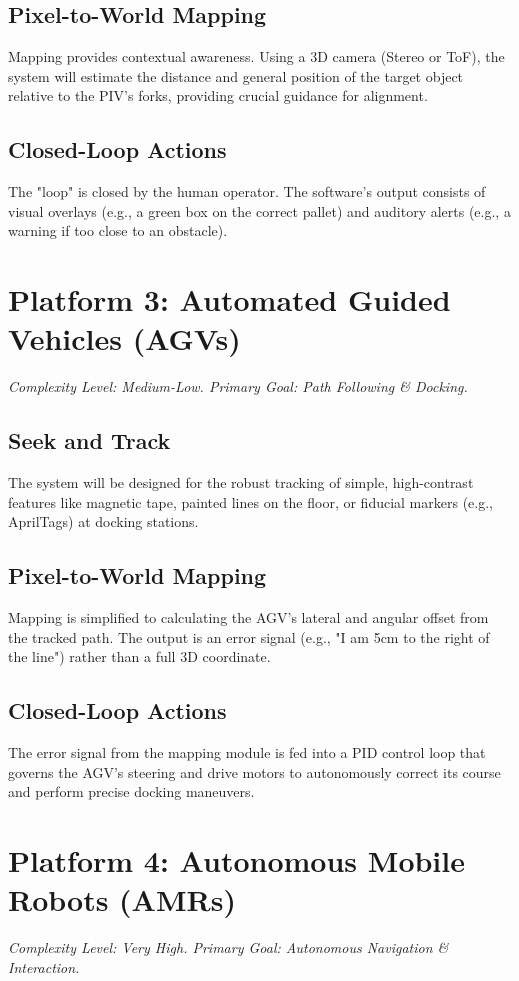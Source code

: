 \subsection{Pixel-to-World Mapping}
Mapping provides contextual awareness. Using a 3D camera (Stereo or ToF), the system will estimate the distance and general position of the target object relative to the PIV's forks, providing crucial guidance for alignment.

\subsection{Closed-Loop Actions}
The "loop" is closed by the human operator. The software's output consists of visual overlays (e.g., a green box on the correct pallet) and auditory alerts (e.g., a warning if too close to an obstacle).

\section{Platform 3: Automated Guided Vehicles (AGVs)}
\textit{Complexity Level: Medium-Low. Primary Goal: Path Following \& Docking.}

\subsection{Seek and Track}
The system will be designed for the robust tracking of simple, high-contrast features like magnetic tape, painted lines on the floor, or fiducial markers (e.g., AprilTags) at docking stations.

\subsection{Pixel-to-World Mapping}
Mapping is simplified to calculating the AGV's lateral and angular offset from the tracked path. The output is an error signal (e.g., "I am 5cm to the right of the line") rather than a full 3D coordinate.

\subsection{Closed-Loop Actions}
The error signal from the mapping module is fed into a PID control loop that governs the AGV's steering and drive motors to autonomously correct its course and perform precise docking maneuvers.

\section{Platform 4: Autonomous Mobile Robots (AMRs)}
\textit{Complexity Level: Very High. Primary Goal: Autonomous Navigation \& Interaction.}

